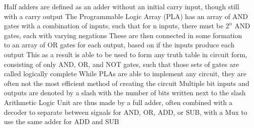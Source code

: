 \documentclass[11 pt, twoside]{article}
\newenvironment{outline*}
{
	\begin{outline}[enumerate]
	}
	{\end{outline}
}
\begin{document}
\begin{outline*}
\3 Half adders are defined as an adder without an initial carry input, though still with a carry output
\2 The Programmable Logic Array (PLA) has an array of AND gates with a combination of inputs, such that for n inputs, there must be $2^n$ AND gates, each with varying negations
\3 These are then connected in some formation to an array of OR gates for each output, based on if the inputs produce each output
\3 This as a result is able to be used to form any truth table in circuit form, consisting of only AND, OR, and NOT gates, such that those sets of gates are called logically complete
\3 While PLAs are able to implement any circuit, they are often not the most efficient method of creating the circuit
\3 Multiple bit inputs and outputs are denoted by a slash with the number of bits written next to the slash
\2 Arithmetic Logic Unit are thus made by a full adder, often combined with a decoder to separate between signals for AND, OR, ADD, or SUB, with a Mux to use the same adder for ADD and SUB
\end{outline*}
\end{document}
